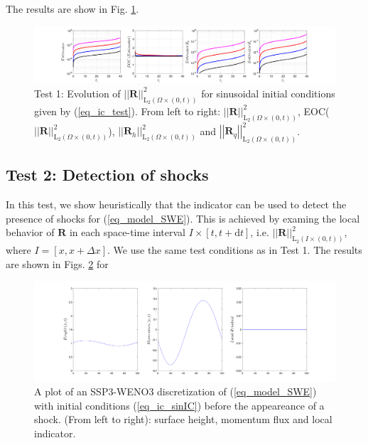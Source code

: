 \documentclass[12pt,a4paper]{article}
\numberwithin{equation}{section}
\theoremstyle{definition}
\newcommand{\Norm}[1]{\left|\left|#1\right|\right|}
\newcommand{\vect}[1]{\textbf{#1}}
\newcommand{\leb}{\text{L}}
\newcommand{\qp}[1]{\left(#1\right)}
\newcommand{\qb}[1]{\left[#1\right]}
\begin{document}
The results are show in Fig. \ref{fig_test_1_benchmark}.

\begin{figure}[h]
\centering
	\includegraphics[scale=0.45]{../figures/fig_SHW_RK3_WENO3_rec3_fixedplots_1x5_shw_periodic}	
	\caption{Test 1: Evolution of $\Norm{\vect{R}}^2_{\leb_2\qp{\Omega\times\qp{0,t}}}$ for sinusoidal initial conditions given by (\ref{eq_ic_test}).  From left to right: $\Norm{\vect{R}}^2_{\leb_2\qp{\Omega\times\qp{0,t}}}$, EOC($\Norm{\vect{R}}^2_{\leb_2\qp{\Omega\times\qp{0,t}}}$), $\Norm{\vect{R}_h}^2_{\leb_2\qp{\Omega\times\qp{0,t}}}$ and $\Norm{\vect{R}_q}^2_{\leb_2\qp{\Omega\times\qp{0,t}}}$.}
	\label{fig_test_1_benchmark}
\end{figure}
\subsection{Test 2: Detection of shocks}
In this test, we show heuristically that the indicator can be used to detect the presence of shocks for (\ref{eq_model_SWE}). This is achieved by examing the local behavior of $\vect{R}$ in each space-time interval $I \times \qb{t, t+\mathrm{d}t}$, i.e. $\Norm{\vect{R}}^2_{\leb_2\qp{I\times\qp{0,t}}}$, where $I=\qb{x, x+\Delta x}$.  We use the same test conditions as in Test 1.  The results are shown in 
Figs. \ref{fig_beforeshock} for 

\begin{figure}[H]
\centering
	\includegraphics[scale=0.45]{../figures/fig_SHW_RK3_WENO3_rec3_fixed_21_dtdx_1}	
	\caption{A plot of an SSP3-WENO3 discretization of (\ref{eq_model_SWE}) with initial conditions (\ref{eq_ic_sinIC}) before the appeareance of a shock. (From left to right): surface height, momentum flux and local indicator.}
	\label{fig_beforeshock}
\end{figure}
\end{document}
